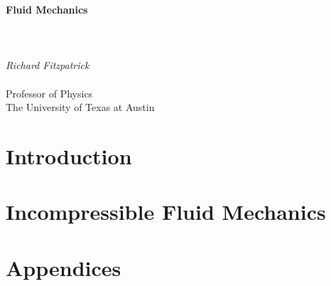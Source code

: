 \documentclass[12pt]{rfbook}
\def\theequation{\arabic{chapter}.\arabic{equation}}
\def\thefigure{\arabic{chapter}.\arabic{figure}}
\def\thetable{\arabic{chapter}.\arabic{table}}
\begin{document}
\thispagestyle{empty}
\begin{center}
{\Huge\bf Fluid Mechanics}\\[1ex]
~\\
~\\
~\\
{\Large\em  Richard Fitzpatrick}\\[1.5ex]~\\[1.5ex]
{\Large\sf  Professor  of Physics}\\[1.5ex]
{\Large\sf  The University of Texas at Austin}
\end{center}

\pagestyle{fancy}
\renewcommand{\chaptermark}[1]{\markboth{#1}{}}
\fancyhf{}
\fancyhead[LO,RE]{\sl \leftmark}
\fancyhead[LE,RO]{\sl \thepage}

\tableofcontents


\part{Introduction}



\part{Incompressible Fluid Mechanics}






\part{Appendices}
\appendix
\def\theequation{\Alph{chapter}.\arabic{equation}}
\def\thefigure{\Alph{chapter}.\arabic{figure}}
\def\thetable{\Alph{chapter}.\arabic{table}}




\end{document}
